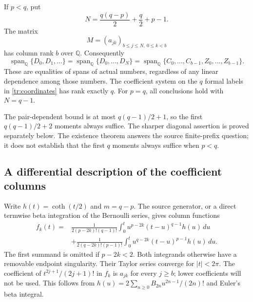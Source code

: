 \begin{theorem}\label{tr:main}
If $p<q$, put
\begin{equation}\label{tr:N}
 N=\frac{q(q-p)}2+\frac q2+p-1.
\end{equation}
The matrix
\[
 M=(a_{jk})_{b\le j\le N,\ 0\le k<b}
\]
has column rank $b$ over $\mathbb Q$. Consequently
\begin{equation}\label{tr:span}
 \operatorname{span}_{\mathbb Q}\{D_0,D_1,\ldots\}
 =\operatorname{span}_{\mathbb Q}\{D_0,\ldots,D_N\}
 =\operatorname{span}_{\mathbb Q}
     \{C_0,\ldots,C_{b-1},Z_0,\ldots,Z_{b-1}\}.
\end{equation}
These are equalities of spans of actual numbers, regardless of any
linear dependence among those numbers. The coefficient system on the
$q$ formal labels in \eqref{tr:coordinates} has rank exactly $q$.
For $p=q$, all conclusions hold with $N=q-1$.
\end{theorem}

The pair-dependent bound is at most $q(q-1)/2+1$, so the first
$q(q-1)/2+2$ moments always suffice. The sharper diagonal assertion is
proved separately below. The existence theorem answers the source
finite-prefix question; it does not establish that the first $q$ moments
always suffice when $p<q$.

\subsection{A differential description of the coefficient columns}

Write $h(t)=\coth(t/2)$ and $m=q-p$. The source generator, or a direct
termwise beta integration of the Bernoulli series, gives column functions
\begin{equation}\label{tr:column}
 \begin{split}
 f_k(t)={}&
 \frac{1}{2(p-2k)!(q-1)!}
       \int_0^t u^{p-2k}(t-u)^{q-1}h(u)\,du\\
 &+\frac{1}{2(q-2k)!(p-1)!}
       \int_0^t u^{q-2k}(t-u)^{p-1}h(u)\,du.
 \end{split}
\end{equation}
The first summand is omitted if $p-2k<2$. Both integrands otherwise
have a removable endpoint singularity. Their Taylor series converge
for $|t|<2\pi$. The coefficient of $t^{2j+1}/(2j+1)!$ in $f_k$ is
$a_{jk}$ for every $j\ge b$; lower coefficients will not be used.
This follows from $h(u)=2\sum_{n\ge0}B_{2n}u^{2n-1}/(2n)!$ and
Euler's beta integral.

